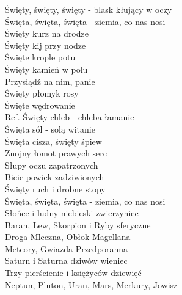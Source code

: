 
\begin{flushleft}
Święty, święty, święty - blask kłujący w oczy  \\
Święta, święta, święta - ziemia, co nas nosi \\
\vskip 3mm
Święty kurz na drodze \\
Święty kij przy nodze \\
Święte krople potu  \\
Święty kamień w polu  \\
Przysiądź na nim, panie  \\
Święty płomyk rosy  \\
Święte wędrowanie  \\
\vskip 3mm
Ref. Święty chleb - chleba łamanie \\
\hspace{0.9cm}Święta sól - solą witanie   \tab{}\\
\hspace{0.9cm}Święta cisza, święty śpiew  \\
\hspace{0.9cm}Znojny łomot prawych serc   \\
\hspace{0.9cm}Słupy oczu zapatrzonych   \tab{}\tab{} \\
\hspace{0.9cm}Bicie powiek zadziwionych  \tab{} \\
\hspace{0.9cm}Święty ruch i drobne stopy  \tab{} \\
\hspace{0.9cm}Święta, święta, święta - ziemia, co nas nosi  \\
\vskip 3mm
Słońce i ludny niebieski zwierzyniec  \\
Baran, Lew, Skorpion i Ryby sferyczne  \\
Droga Mleczna, Obłok Magellana  \\
Meteory, Gwiazda Przedporanna   \\
Saturn i Saturna dziwów wieniec   \tab{}\\
Trzy pierścienie i księżyców dziewięć  \tab{} \\
Neptun, Pluton, Uran, Mars, Merkury, Jowisz   \tab{}\\

\end{flushleft}
